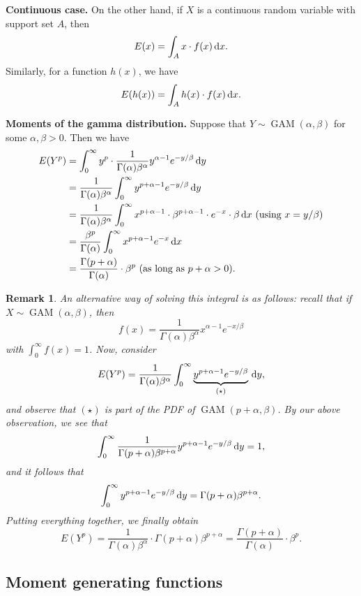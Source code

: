 \documentclass[10pt]{article}
\DeclareMathOperator{\GAM}{GAM}
\theoremstyle{newstyle}
\newtheorem{remark}[thm]{Remark}
\begin{document}
{\bf Continuous case.} On the other hand, if $X$ is a continuous random variable with support set $A$, then
\[ E(x) = \int_A x \cdot f(x)\,{\rm d}x. \] 
Similarly, for a function $h(x)$, we have 
\[ E(h(x)) = \int_A h(x) \cdot f(x) \, {\rm d}x. \]

{\bf Moments of the gamma distribution.} Suppose that $Y \sim \GAM(\alpha, \beta)$ for some 
$\alpha, \beta > 0$. Then we have 
\begin{align*}
    E(Y^p) &= \int_0^\infty y^p \cdot \frac{1}{\Gamma(\alpha) \beta^\alpha} y^{\alpha-1} e^{-y/\beta}
    \, {\rm d}y \\
    &= \frac{1}{\Gamma(\alpha)\beta^\alpha} \int_0^\infty y^{p+\alpha-1} e^{-y/\beta} \, {\rm d}y \\
    &= \frac{1}{\Gamma(\alpha)\beta^\alpha} \int_0^\infty x^{p+\alpha-1} \cdot 
    \beta^{p+\alpha-1} \cdot e^{-x} \cdot \beta \, {\rm d}x \text{ (using $x = y/\beta$)} \\
    &= \frac{\beta^p}{\Gamma(\alpha)} \int_0^\infty x^{p+\alpha-1} e^{-x} \, {\rm d}x \\
    &= \frac{\Gamma(p+\alpha)}{\Gamma(\alpha)} \cdot \beta^p \text{ (as long as $p+\alpha>0$)}. 
\end{align*}

\begin{remark}
An alternative way of solving this integral is as follows: recall that if $X \sim \GAM(\alpha, \beta)$, 
then 
\[ f(x) = \frac{1}{\Gamma(\alpha) \beta^\alpha} x^{\alpha-1} e^{-x/\beta} \]
with $\int_0^\infty f(x) = 1$. Now, consider 
\[ E(Y^p) = \frac{1}{\Gamma(\alpha)\beta^\alpha} \int_0^\infty 
\underbrace{y^{p+\alpha-1} e^{-y/\beta}}_{(\star)} \, {\rm d}y, \]
and observe that $(\star)$ is part of the PDF of $\GAM(p+\alpha, \beta)$. By our above observation, 
we see that
\[ \int_0^\infty \frac{1}{\Gamma(p+\alpha)\beta^{p+\alpha}} y^{p+\alpha-1} e^{-y/\beta} \, {\rm d}y = 1, \]
and it follows that
\[ \int_0^\infty y^{p+\alpha-1} e^{-y/\beta} \, {\rm d}y = \Gamma(p+\alpha)\beta^{p+\alpha}. \]
Putting everything together, we finally obtain 
\[ E(Y^p) = \frac{1}{\Gamma(\alpha)\beta^\alpha} \cdot \Gamma(p+\alpha)\beta^{p+\alpha} = 
\frac{\Gamma(p+\alpha)}{\Gamma(\alpha)} \cdot \beta^p. \]
\end{remark}

\subsection{Moment generating functions}
\end{document}
